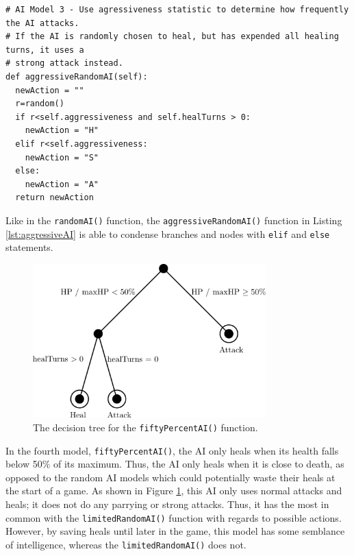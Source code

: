 \begin{lstlisting}
# AI Model 3 - Use agressiveness statistic to determine how frequently the AI attacks.
# If the AI is randomly chosen to heal, but has expended all healing turns, it uses a
# strong attack instead.
def aggressiveRandomAI(self):
  newAction = ""
  r=random()
  if r<self.aggressiveness and self.healTurns > 0:
    newAction = "H"
  elif r<self.aggressiveness:
    newAction = "S"
  else:
    newAction = "A"
  return newAction
\end{lstlisting}

Like in the \texttt{randomAI()} function, the \texttt{aggressiveRandomAI()} function in Listing \ref{lst:aggressiveAI} is able to condense branches and nodes with \texttt{elif} and \texttt{else} statements.

\begin{figure}[H]
  \centering
  \includegraphics[width=9cm]{figures/AI50Percent.png}
  \caption{The decision tree for the \texttt{fiftyPercentAI()} function.}
  \label{fig:AI4}
\end{figure}

In the fourth model, \texttt{fiftyPercentAI()}, the AI only heals when its health falls below 50\% of its maximum. Thus, the AI only heals when it is close to death, as opposed to the random AI models which could potentially waste their heals at the start of a game. As shown in Figure \ref{fig:AI4}, this AI only uses normal attacks and heals; it does not do any parrying or strong attacks. Thus, it has the most in common with the \texttt{limitedRandomAI()} function with regards to possible actions. However, by saving heals until later in the game, this model has some semblance of intelligence, whereas the \texttt{limitedRandomAI()} does not.

